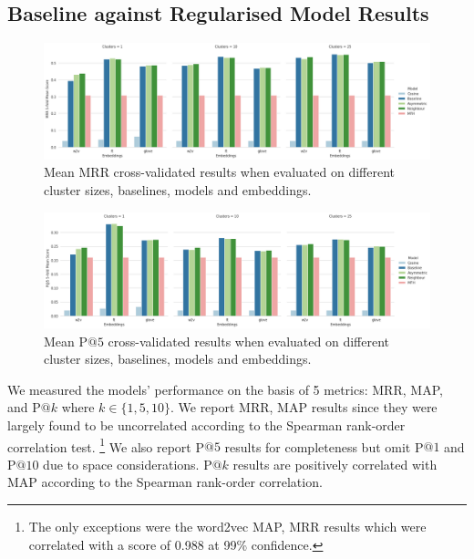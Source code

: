 \subsection{Baseline against Regularised Model Results}
\begin{figure}[ht!] 
  \centering
  \includegraphics[width=1.\linewidth]{images/MRR_5-fold_results_models_baselines_embeddings.png}
  \caption{Mean MRR cross-validated results when evaluated on different cluster sizes, baselines, models and embeddings.}
  \label{fig:MRR_models_baselines}
\end{figure}

\begin{figure}[ht!] 
  \centering
  \includegraphics[width=1.\linewidth]{images/PAt5_5-fold_results_models_baselines_embeddings.png}
  \caption{Mean P$@5$ cross-validated results when evaluated on different cluster sizes, baselines, models and embeddings.}
  \label{fig:pat5_models_baselines}
\end{figure}

We measured the models' performance on the basis of 5 metrics: \ac{MRR}, \ac{MAP}, and P$@k$ where $k \in \{1, 5, 10\}$.  We report MRR, MAP results since they were largely found to be uncorrelated according to the Spearman rank-order correlation test. \footnote{The only exceptions were the word2vec MAP, MRR results which were correlated with a score of 0.988 at 99\% confidence.}   We also report P$@5$ results for completeness but omit P$@1$ and P$@10$ due to space considerations.  P$@k$ results are positively correlated with \ac{MAP} according to the Spearman rank-order correlation.


